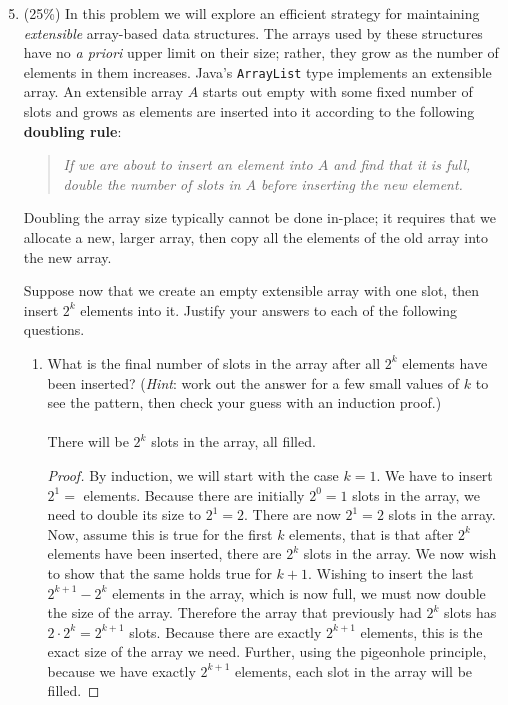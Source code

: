 \documentclass[11pt]{article}
\begin{document}
\begin{enumerate}
\setcounter{enumi}{4}
\item (25\%)
In this problem we will explore an efficient strategy for maintaining
\textit{extensible} array-based data structures.  The arrays used by
these structures have no \textit{a priori} upper limit on their size;
rather, they grow as the number of elements in them increases.  Java's
\texttt{ArrayList} type implements an extensible array.
An extensible array $A$ starts out empty with some fixed number of
slots and grows as elements are inserted into it according to
the following \textbf{doubling rule}:
\begin{quote}
\textit{If we are about to insert an element into $A$ and find that it is
full, double the number of slots in $A$ before inserting the new
element.}
\end{quote}
Doubling the array size typically cannot be done in-place; it requires
that we allocate a new, larger array, then copy all the elements of
the old array into the new array.

Suppose now that we create an empty extensible array with one slot,
then insert $2^k$ elements into it.  Justify your answers to each of
the following questions.

\begin{enumerate}

\item
What is the final number of slots in the array after all $2^k$
elements have been inserted? (\textit{Hint}: work out the answer for
a few small values of $k$ to see the pattern, then check your
guess with an induction proof.)
\\ \\
There will be $2^k$ slots in the array, all filled.
\begin{proof}
By induction, we will start with the case $k=1$.  We have to insert $2^1=$ elements.  Because there are initially $2^0=1$ slots in the array, we need to double its size to $2^1=2$.  There are now $2^1=2$ slots in the array.  Now, assume this is true for the first $k$ elements, that is that after $2^k$ elements have been inserted, there are $2^k$ slots in the array.  We now wish to show that the same holds true for $k+1$.  Wishing to insert the last $2^{k+1}-2^k$ elements in the array, which is now full, we must now double the size of the array.  Therefore the array that previously had $2^k$ slots has $2 \cdot  2^k= 2^{k+1}$ slots.  Because there are exactly $2^{k+1}$ elements, this is the exact size of the array we need.  Further, using the pigeonhole principle, because we have exactly $2^{k+1}$ elements, each slot in the array will be filled.
\end{proof}



\end{enumerate}
\end{enumerate}
\end{document}
